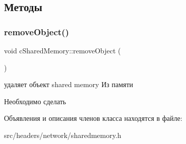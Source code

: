 \subsection{Методы}
\mbox{\label{classc_shared_memory_a1789ddec46e9e097d108ad69d188cd18}} 
\subsubsection{\texorpdfstring{remove\+Object()}{removeObject()}}
{\footnotesize\ttfamily void c\+Shared\+Memory\+::remove\+Object (\begin{DoxyParamCaption}{ }\end{DoxyParamCaption})}



удаляет объект shared memory Из памяти 

\begin{DoxyRefDesc}{Необходимо сделать}
\item[\hyperlink{todo__todo000003}{Необходимо сделать}]\end{DoxyRefDesc}


Объявления и описания членов класса находятся в файле\+:\begin{DoxyCompactItemize}
\item 
src/headers/network/sharedmemory.\+h\end{DoxyCompactItemize}
